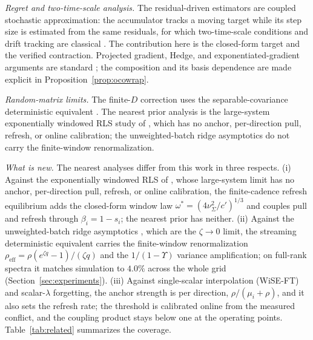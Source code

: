 \documentclass[twoside,11pt]{article}
\begin{document}
\emph{Regret and two-time-scale analysis.}
The residual-driven estimators are coupled stochastic approximation: the accumulator tracks a moving target while its step size is estimated from the same residuals, for which two-time-scale conditions and drift tracking are classical \citep{benveniste1990,kushner2003,borkar2008}.
The contribution here is the closed-form target and the verified contraction.
Projected gradient, Hedge, and exponentiated-gradient arguments are standard \citep{zinkevich2003,freund1997,kivinen1997}; the composition and its basis dependence are made explicit in Proposition~\ref{prop:ocowrap}.

\emph{Random-matrix limits.}
The finite-\(D\) correction uses the separable-covariance deterministic equivalent \citep{silverstein1995,rubio2011,hachem2007}.
The nearest prior analysis is the large-system exponentially windowed RLS study of \citet{xiao2005}, which has no anchor, per-direction pull, refresh, or online calibration; the unweighted-batch ridge asymptotics \citep{hastie2022,pafka2004} do not carry the finite-window renormalization.

\emph{What is new.}
The nearest analyses differ from this work in three respects.
(i) Against the exponentially windowed RLS of \citet{xiao2005}, whose large-system limit has no anchor, per-direction pull, refresh, or online calibration, the finite-cadence refresh equilibrium adds the closed-form window law $\omega^*=(4\nu^2_\Sigma/c')^{1/3}$ and couples pull and refresh through $\beta_i=1-s_i$; the nearest prior has neither.
(ii) Against the unweighted-batch ridge asymptotics \citep{hastie2022,pafka2004,silverstein1995,rubio2011,hachem2007}, which are the $\zeta\to0$ limit, the streaming deterministic equivalent carries the finite-window renormalization $\rho_{\mathrm{eff}}=\rho(e^{\zeta q}-1)/(\zeta q)$ and the $1/(1-\Upsilon)$ variance amplification; on full-rank spectra it matches simulation to $4.0\%$ across the whole grid (Section~\ref{sec:experiments}).
(iii) Against single-scalar interpolation (WiSE-FT) and scalar-$\lambda$ forgetting, the anchor strength is per direction, $\rho/(\mu_i+\rho)$, and it also sets the refresh rate; the threshold is calibrated online from the measured conflict, and the coupling product stays below one at the operating points.
Table~\ref{tab:related} summarizes the coverage.
\end{document}
